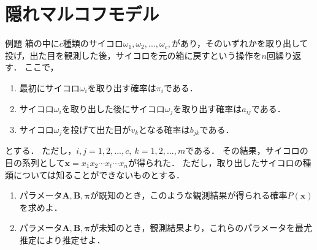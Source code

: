 \documentclass[a4j]{jarticle}
\begin{document}
\newpage

\section{隠れマルコフモデル}
\begin{sqbrrotnbr}{例題}
	\quad 箱の中に$c$種類のサイコロ$\omega_{1}, \omega_{2}, ..., \omega_{c},$があり，そのいずれかを取り出して投げ，出た目を観測した後，サイコロを元の箱に戻すという操作を$n$回繰り返す．
	ここで，
	\begin{enumerate}
		\item 最初にサイコロ$\omega_{i}$を取り出す確率は$\pi_{i}$である．
		\item サイコロ$\omega_{i}$を取り出した後にサイコロ$\omega_{j}$を取り出す確率は$a_{ij}$である．
		\item サイコロ$\omega_{j}$を投げて出た目が$v_{k}$となる確率は$b_{jk}$である．
	\end{enumerate}
	とする．
	ただし，$i,j=1,2,...,c,\ k=1,2,...,m$である．
	その結果，サイコロの目の系列として$\mathbf{x} = x_{1}x_{2} \cdots x_{t} \cdots x_{n}$が得られた．
	ただし，取り出したサイコロの種類については知ることができないものとする．

	\begin{enumerate}[label=(\arabic*)]
		\item パラメータ$\bm{A},\bm{B},\bm{\pi}$が既知のとき，このような観測結果が得られる確率$P(\mathbf{x})$を求めよ．
		\item パラメータ$\bm{A},\bm{B},\bm{\pi}$が未知のとき，観測結果より，これらのパラメータを最尤推定により推定せよ．
	\end{enumerate}
\end{sqbrrotnbr}
\end{document}
